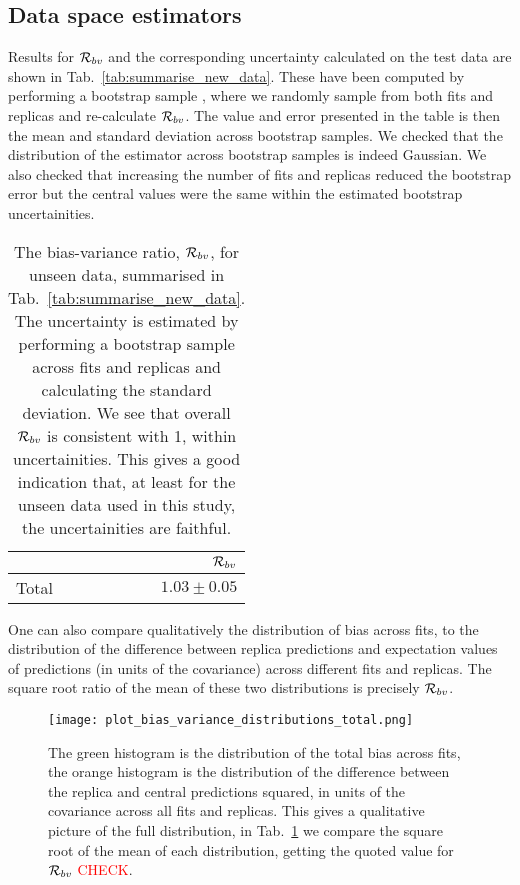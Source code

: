 \subsection{Data space estimators}

Results for $\mathcal{R}_{bv}$ and the corresponding uncertainty calculated on the test data are shown in
Tab.~\ref{tab:summarise_new_data}. These have been computed by performing a bootstrap sample
\cite{efron1994introduction}, where we randomly sample from both fits and replicas and re-calculate
$\mathcal{R}_{bv}$. The value and error presented in the table is then the mean
and standard deviation across bootstrap samples. We checked that the distribution
of the estimator across bootstrap samples is indeed Gaussian. We also checked
that increasing the number of fits and replicas reduced the bootstrap error but
the central values were the same within the estimated bootstrap uncertainities.

\begin{table}[hb]
    \begin{center}
        \begin{tabular}{lr}
            \toprule
            {}     &  $\mathcal{R}_{bv}$ \\
            \midrule
            Total  &  $1.03\pm0.05$   \\
            \bottomrule
            \end{tabular}
    \end{center}
    \caption{
        The bias-variance ratio, $\mathcal{R}_{bv}$, for unseen data, summarised in
        Tab.~\ref{tab:summarise_new_data}. The uncertainty is estimated by
        performing a bootstrap sample across fits and replicas and calculating
        the standard deviation. We see that overall $\mathcal{R}_{bv}$ is consistent
        with 1, within uncertainities. This gives a good indication that, at least
        for the unseen data used in this study, the uncertainities are faithful.
    }
    \label{tab:biasvarratio}
\end{table}

One can also compare qualitatively the distribution of bias across fits, to the
distribution of the difference between replica predictions and expectation
values of predictions (in units of the covariance) across different fits
and replicas. The square root ratio of the mean of these two distributions
is precisely $\mathcal{R}_{bv}$.

\begin{figure}[h]
    \centering
    \texttt{[image: plot\_bias\_variance\_distributions\_total.png]}
    \caption{The green histogram is the distribution of the total bias across fits,
    the orange histogram is the distribution of the difference between the
    replica and central predictions squared, in units of the covariance
    across all fits and replicas. This gives a qualitative picture of the full
    distribution, in Tab.~\ref{tab:biasvarratio} we compare the square root of the
    mean of each distribution, getting the quoted value for $\mathcal{R}_{bv}$ \textcolor{red}{CHECK}.}
\end{figure}


